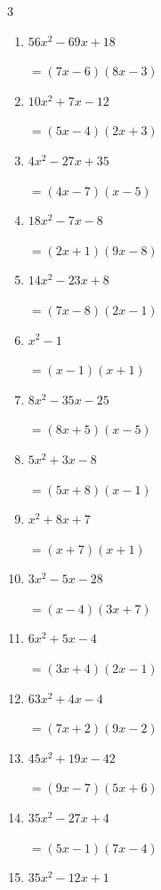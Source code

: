 \begin{multicols}{3}
\begin{enumerate}
\columnbreak %

\resetques

  \item $56x^{2}-69x+18$

        $=(7x-6)(8x-3)$

  \item $10x^{2}+7x-12$

        $=(5x-4)(2x+3)$

  \item $4x^{2}-27x+35$

        $=(4x-7)(x-5)$

  \item $18x^{2}-7x-8$

        $=(2x+1)(9x-8)$

  \item $14x^{2}-23x+8$

        $=(7x-8)(2x-1)$

  \item $x^{2}-1$

        $=(x-1)(x+1)$

  \item $8x^{2}-35x-25$

        $=(8x+5)(x-5)$

  \item $5x^{2}+3x-8$

        $=(5x+8)(x-1)$

  \item $x^{2}+8x+7$

        $=(x+7)(x+1)$

  \item $3x^{2}-5x-28$

        $=(x-4)(3x+7)$

\columnbreak %

  \item $6x^{2}+5x-4$

        $=(3x+4)(2x-1)$

  \item $63x^{2}+4x-4$

        $=(7x+2)(9x-2)$

  \item $45x^{2}+19x-42$

        $=(9x-7)(5x+6)$

  \item $35x^{2}-27x+4$

        $=(5x-1)(7x-4)$

  \item $35x^{2}-12x+1$


\end{enumerate}
\end{multicols}
